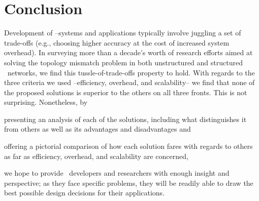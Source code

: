\section{Conclusion}
\label{section:conclusion}

%
Development of \p--systems and applications
typically involve juggling a set of trade-offs (e.g.,
choosing higher accuracy at the cost of increased system overhead).
In surveying more than
a decade's worth of research efforts aimed at solving the topology mismatch
problem in both unstructured and structured \p\ networks, we find this
tussle-of-trade-offs property to hold.  
With regards to the three criteria we used --efficiency,
overhead, and scalability-- we find that none of the proposed solutions 
is superior to the others on all three fronts.  This is not surprising.
Nonetheless, by
\begin{inparaenum}
  \item presenting an analysis of each of the solutions,
including what distinguishes it from 
others as well as its advantages and disadvantages and 
  \item offering a pictorial
comparison of how each solution fares with regards to others 
as far as
efficiency, overhead, and scalability are concerned,
\end{inparaenum}
we hope to provide \p\
developers and researchers with enough insight and perspective;
as they face specific problems, they will be readily able to 
draw the best possible design decisions for their applications.
